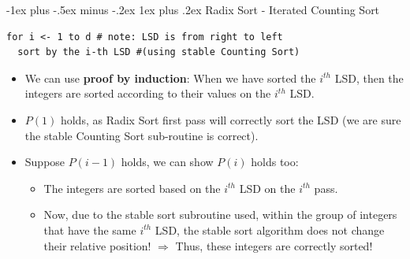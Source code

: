 \documentclass[10pt,landscape]{article}
\makeatletter
\newcommand{\subsubsubsection}{\@startsection{subsubsection}{3}{0mm}%
                                {-1ex plus -.5ex minus -.2ex}%
                                {1ex plus .2ex}%
                                {\normalfont\scriptsize\bfseries}}
\newcommand{\1}{\mathmybb{1}}
\makeatother
\begin{document}
\begin{multicols*}{3}
\subsubsubsection{Radix Sort - Iterated Counting Sort}
\begin{lstlisting}
for i <- 1 to d # note: LSD is from right to left
  sort by the i-th LSD #(using stable Counting Sort)
\end{lstlisting}
\begin{itemize}[topsep=0pt,noitemsep,wide=0pt, leftmargin=\dimexpr{} + 2\relax]
  \item We can use \textbf{proof by induction}: When we have sorted the $i^{th}$ LSD, then the integers are sorted according to their values on the $i^{th}$ LSD.
  \item $P(1)$ holds, as Radix Sort first pass will correctly sort the LSD (we are sure the stable Counting Sort sub-routine is correct).
  \item Suppose $P(i - 1)$ holds, we can show $P(i)$ holds too:
  \begin{itemize}[topsep=0pt,noitemsep,wide=0pt, leftmargin=\dimexpr{} + 2\relax]
    \item The integers are sorted based on the $i^{th}$ LSD on the $i^{th}$ pass.
    \item Now, due to the stable sort subroutine used, within the group of integers that have the same $i^{th}$ LSD, the stable sort algorithm does not change their relative position! $\Rightarrow$ Thus, these integers are correctly sorted!
  \end{itemize}
\end{itemize}


\end{multicols*}
\end{document}
